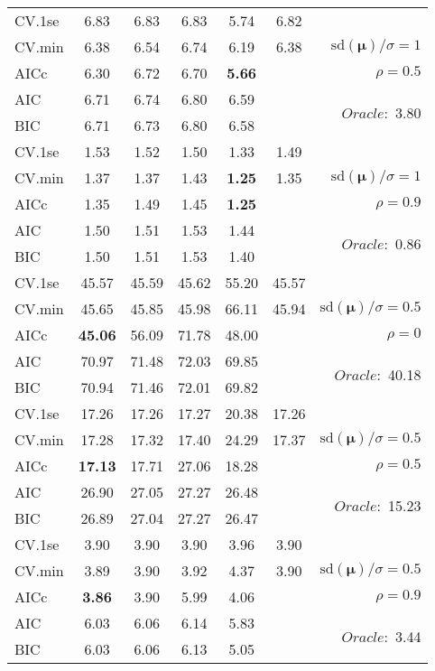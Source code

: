 \begin{table}
\begin{center}
\begin{tabular}{l*{5}{c}|r}
 \hline 
CV.1se & 6.83 & 6.83 & 6.83 & 5.74 & 6.82 & \\
CV.min & 6.38 & 6.54 & 6.74 & 6.19 & 6.38 &  $\mathrm{sd}(\mathbf{\mu})/\sigma=1$ \\
AICc & 6.30 & 6.72 & 6.70 & {\bf 5.66} & & $\rho=0.5$ \\
AIC & 6.71 & 6.74 & 6.80 & 6.59 & &  \multirow{2}{*}{$Oracle: $ 3.80} \\
BIC & 6.71 & 6.73 & 6.80 & 6.58 & &  \\
 \hline 
CV.1se & 1.53 & 1.52 & 1.50 & 1.33 & 1.49 & \\
CV.min & 1.37 & 1.37 & 1.43 & {\bf 1.25} & 1.35 &  $\mathrm{sd}(\mathbf{\mu})/\sigma=1$ \\
AICc & 1.35 & 1.49 & 1.45 & {\bf 1.25} & & $\rho=0.9$ \\
AIC & 1.50 & 1.51 & 1.53 & 1.44 & &  \multirow{2}{*}{$Oracle: $ 0.86} \\
BIC & 1.50 & 1.51 & 1.53 & 1.40 & &  \\
 \hline 
CV.1se & 45.57 & 45.59 & 45.62 & 55.20 & 45.57 & \\
CV.min & 45.65 & 45.85 & 45.98 & 66.11 & 45.94 &  $\mathrm{sd}(\mathbf{\mu})/\sigma=0.5$ \\
AICc & {\bf 45.06} & 56.09 & 71.78 & 48.00 & & $\rho=0$ \\
AIC & 70.97 & 71.48 & 72.03 & 69.85 & &  \multirow{2}{*}{$Oracle: $ 40.18} \\
BIC & 70.94 & 71.46 & 72.01 & 69.82 & &  \\
 \hline 
CV.1se & 17.26 & 17.26 & 17.27 & 20.38 & 17.26 & \\
CV.min & 17.28 & 17.32 & 17.40 & 24.29 & 17.37 &  $\mathrm{sd}(\mathbf{\mu})/\sigma=0.5$ \\
AICc & {\bf 17.13} & 17.71 & 27.06 & 18.28 & & $\rho=0.5$ \\
AIC & 26.90 & 27.05 & 27.27 & 26.48 & &  \multirow{2}{*}{$Oracle: $ 15.23} \\
BIC & 26.89 & 27.04 & 27.27 & 26.47 & &  \\
 \hline 
CV.1se & 3.90 & 3.90 & 3.90 & 3.96 & 3.90 & \\
CV.min & 3.89 & 3.90 & 3.92 & 4.37 & 3.90 &  $\mathrm{sd}(\mathbf{\mu})/\sigma=0.5$ \\
AICc & {\bf 3.86} & 3.90 & 5.99 & 4.06 & & $\rho=0.9$ \\
AIC & 6.03 & 6.06 & 6.14 & 5.83 & &  \multirow{2}{*}{$Oracle: $ 3.44} \\
BIC & 6.03 & 6.06 & 6.13 & 5.05 & &  \\
 \hline 
\end{tabular}
\end{center}
\vspace{-1cm}
\end{table}





